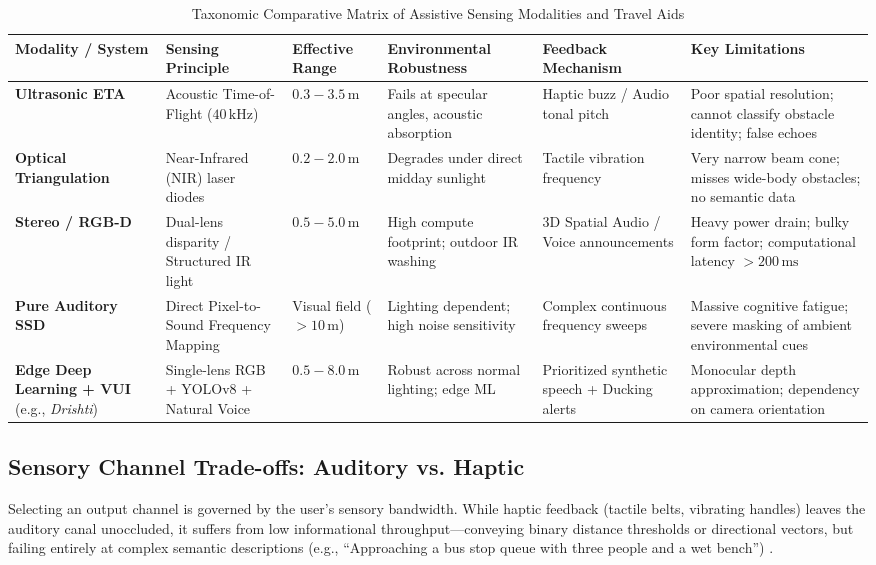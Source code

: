 \documentclass[10pt,twocolumn]{article}
\begin{document}
\begin{table}[t]
\centering
\small
\caption{Taxonomic Comparative Matrix of Assistive Sensing Modalities and Travel Aids}
\label{tab:taxonomy}
\begin{tabularx}{\textwidth}{l p{2.2cm} p{2.5cm} p{2.4cm} p{2.8cm} X}
\toprule
\textbf{Modality / System} & \textbf{Sensing Principle} & \textbf{Effective Range} & \textbf{Environmental Robustness} & \textbf{Feedback Mechanism} & \textbf{Key Limitations} \\
\midrule
\textbf{Ultrasonic ETA} \cite{kay1974ultrasonic, bhowmick2017vision} & Acoustic Time-of-Flight ($40\,\text{kHz}$) & $0.3 - 3.5\,\text{m}$ & Fails at specular angles, acoustic absorption & Haptic buzz / Audio tonal pitch & Poor spatial resolution; cannot classify obstacle identity; false echoes \\
\addlinespace
\textbf{Optical Triangulation} \cite{cardillo2000ultrasonic} & Near-Infrared (NIR) laser diodes & $0.2 - 2.0\,\text{m}$ & Degrades under direct midday sunlight & Tactile vibration frequency & Very narrow beam cone; misses wide-body obstacles; no semantic data \\
\addlinespace
\textbf{Stereo / RGB-D} \cite{rodriguez2012assisting, tapu2014real} & Dual-lens disparity / Structured IR light & $0.5 - 5.0\,\text{m}$ & High compute footprint; outdoor IR washing & 3D Spatial Audio / Voice announcements & Heavy power drain; bulky form factor; computational latency $> 200\,\text{ms}$ \\
\addlinespace
\textbf{Pure Auditory SSD} \cite{meijer1992augmented, abboud2014eyemusic} & Direct Pixel-to-Sound Frequency Mapping & Visual field ($>10\,\text{m}$) & Lighting dependent; high noise sensitivity & Complex continuous frequency sweeps & Massive cognitive fatigue; severe masking of ambient environmental cues \\
\addlinespace
\textbf{Edge Deep Learning + VUI} (e.g., \textit{Drishti}) & Single-lens RGB + YOLOv8 + Natural Voice & $0.5 - 8.0\,\text{m}$ & Robust across normal lighting; edge ML & Prioritized synthetic speech + Ducking alerts & Monocular depth approximation; dependency on camera orientation \\
\bottomrule
\end{tabularx}
\end{table}

\subsection{Sensory Channel Trade-offs: Auditory vs. Haptic}
Selecting an output channel is governed by the user's sensory bandwidth. While haptic feedback (tactile belts, vibrating handles) leaves the auditory canal unoccluded, it suffers from low informational throughput---conveying binary distance thresholds or directional vectors, but failing entirely at complex semantic descriptions (e.g., ``Approaching a bus stop queue with three people and a wet bench'') \cite{velazquez2010wearable}. 
\end{document}
